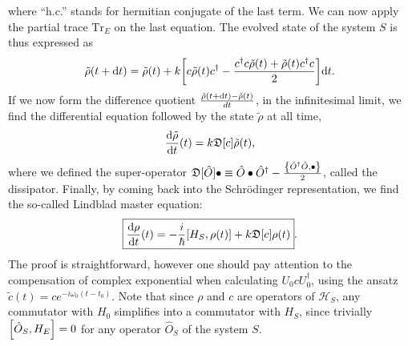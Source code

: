 where ``h.c.'' stands for hermitian conjugate of the last term. We can now apply the partial trace $\mathrm{Tr}_E$ on the last equation. The evolved state of the system $S$ is thus expressed as
\begin{equation*}
    \tilde{\rho}(t+\mathrm{d}t)=\tilde{\rho}(t)+k\qty[c\tilde{\rho}(t)c^\dagger - \frac{c^\dagger c\tilde{\rho}(t)+\tilde{\rho}(t)c^\dagger c}{2}]\mathrm{d}t.
\end{equation*}
If we now form the difference quotient $\frac{\tilde{\rho}(t+\mathrm{d}t)-\tilde{\rho}(t)}{dt}$, in the infinitesimal limit, we find the differential equation followed by the state $\tilde{\rho}$ at all time,
\begin{equation}
    \frac{\mathrm{d}\tilde{\rho}}{\mathrm{d}t}(t)=k\mathfrak{D}[c]\tilde{\rho}(t),
\end{equation}
where we defined the super-operator $\mathfrak{D}[\hat{O}]\bullet\equiv \hat{O}\bullet\hat{O}^\dagger-\frac{\qty{\hat{O}^\dagger\hat{O},\bullet}}{2}$, called the dissipator. Finally, by coming back into the Schrödinger representation, we find the so-called {Lindblad master equation}:
\begin{equation}\label{eq:LindbladME}
    \boxed{\frac{\mathrm{d}\rho}{\mathrm{d}t}(t)=-\frac{i}{\hbar}\qty[H_S, \rho(t)]+k\mathfrak{D}[c]\rho(t)}.
\end{equation}
The proof is straightforward, however one should pay attention to the compensation of complex exponential when calculating $U_0cU^\dagger_0$, using the ansatz $\tilde{c}(t)=ce^{-i\omega_0(t-t_0)}$. Note that since $\rho$ and $c$ are operators of $\mathcal{H}_S$, any commutator with $H_0$ simplifies into a commutator with $H_S$, since trivially $\qty[\hat{O}_S,H_E]=0$ for any operator $\hat{O}_S$ of the system $S$.